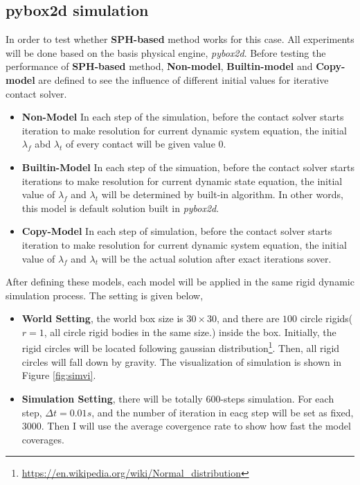 \subsection{pybox2d simulation}
    \label{sph:exp}
    In order to test whether \textbf{SPH-based} method works for this case. All experiments will be done based on the basis physical engine, \textit{pybox2d}. Before testing the performance of \textbf{SPH-based} method, \textbf{Non-model}, \textbf{Builtin-model} and \textbf{Copy-model} are defined to see the influence of different initial values for iterative contact solver.
    \begin{itemize}
        \item \textbf{Non-Model} In each step of the simulation, before the contact solver starts iteration to make resolution for current dynamic system equation, the initial $\lambda_{f}$ abd $\lambda_{t}$ of every contact will be given value $0$.
        \item \textbf{Builtin-Model} In each step of the simuation, before the contact solver starts iterations to make resolution for current dynamic state equation, the initial value of $\lambda_f$ and $\lambda_{t}$ will be determined by built-in algorithm. In other words, this model is default solution built in \textit{pybox2d}.
        \item \textbf{Copy-Model} In each step of simulation, before the contact solver starts iteration to make resolution for current dynamic system equation, the initial value of $\lambda_f$ and $\lambda_t$ will be the actual solution after exact iterations sover.
    \end{itemize}
    After defining these models, each model will be applied in the same rigid dynamic simulation process. The setting is given below,
    \begin{itemize}
        \item \textbf{World Setting}, the world box size is $30\times30$,   and there are $100$ circle rigids($r=1$, all circle rigid bodies in the same size.) inside the box. Initially, the rigid circles will be located following gaussian distribution\footnote{\url{https://en.wikipedia.org/wiki/Normal_distribution}}. Then, all rigid circles will fall down by gravity. The visualization of simulation is shown in Figure \ref{fig:simvi}.
        \item \textbf{Simulation Setting}, there will be totally $600$-steps simulation. For each step, $\Delta t = 0.01s$, and the number of iteration in  eacg step will be set as fixed, $3000$. Then I will use the average covergence rate to show how fast the model coverages.
    \end{itemize}
